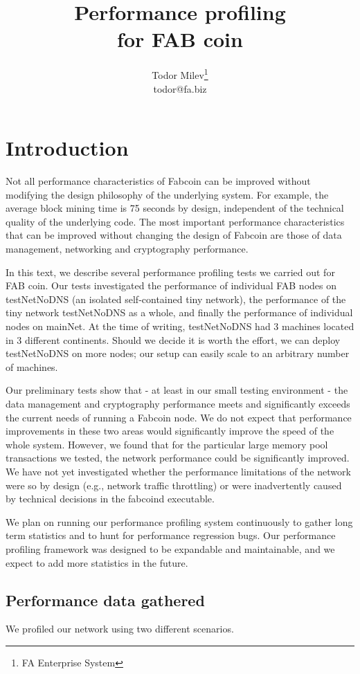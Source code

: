 \documentclass{article}
\title{
Performance profiling \\
for FAB coin
}
\author{Todor Milev\footnote{FA Enterprise System}\\ todor@fa.biz}
\begin{document}
\maketitle
\section{Introduction}
Not all performance characteristics of Fabcoin can be improved without modifying the design philosophy of the underlying system. For example, the average block mining time is 75 seconds by design, independent of the technical quality of the underlying code. The most important performance characteristics that can be improved without changing the design of Fabcoin are those of data management, networking and cryptography performance. 


In this text, we describe several performance profiling tests we carried out for FAB coin. Our tests investigated the performance of individual FAB nodes on testNetNoDNS (an isolated self-contained tiny network), the performance of the tiny network testNetNoDNS as a whole, and finally the performance of individual nodes on mainNet. At the time of writing, testNetNoDNS had $3$ machines located in $3$ different continents. Should we decide it is worth the effort, we can deploy testNetNoDNS on more nodes; our setup can easily scale to an arbitrary number of machines.

Our preliminary tests show that - at least in our small testing environment - the data management and cryptography performance meets and significantly exceeds the current needs of running a Fabcoin node. We do not expect that performance improvements in these two areas would significantly improve the speed of the whole system. However, we found that for the particular large memory pool transactions we tested, the network performance could be significantly improved. We have not yet investigated whether the performance limitations of the network were so by design (e.g., network traffic throttling) or were inadvertently caused by technical decisions in the fabcoind executable.

We plan on running our performance profiling system continuously to gather long term statistics and to hunt for performance regression bugs. Our performance profiling framework was designed to be expandable and maintainable, and we expect to add more statistics in the future. 

\subsection{Performance data gathered}
We profiled our network using two different scenarios. 
\end{document}
